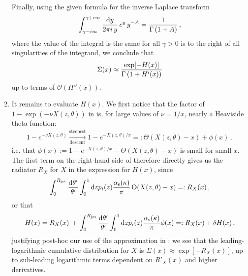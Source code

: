 \begin{enumerate}[label=\alph*)]
    Finally, using the given formula for the inverse Laplace transform
    \begin{align}
        \label{eq:inverse-laplace-example}
        \int_{\gamma - i \infty}^{\gamma + i\infty}
        \frac{\dd y}{2\pi i\, y}
        \,
        e^{y} \,y^{-A}
        =
        \frac{1}{\Gamma\le(1 + A\ri)}
        \,,
    \end{align}
    where the value of the integral is the same for all \(\gamma > 0\) is to the right of all singularities of the integrand, we conclude that
    \begin{align}
        \Sigma(x)
        \approx
        \frac{\exp[-H(x)]}{\Gamma\left(1 + H'(x)\right)}
    \end{align}
    up to terms of \(\mathcal{O}(H''(x))\).


    \item
    It remains to evaluate \(H(x)\).
    We first notice that the factor of \(1 - \exp(-\nu X(z,\theta))\) in  is, for large values of \(\nu = 1/x\), nearly a Heaviside theta function:
    \begin{align}
        \label{eq:exponential-approx-heaviside}
        1 - e^{-\nu X(z,\theta)}
        \xrightarrow[\text{descent}]{\text{steepest}}
        1 - e^{-X(z,\theta)/x}
        =:
        \Theta(X(z,\theta) - x) + \phi(x)
        \,,
    \end{align}
    i.e. that \(\phi(x) := 1 - e^{-X(z,\theta)/x} - \Theta(X(z,\theta) - x)\) is small for small \(x\).
    The first term on the right-hand side of  therefore directly gives us the radiator \(R_X\) for \(X\) in the expression for \(H(x)\), since
    \begin{align}
        \int_0^{R_\text{jet}} \frac{\dd \theta'}{\theta'}
        \int_0^1 \dd z p_i(z)
        \frac{\alpha_{\mathrm{s}}(\kappa)}{\pi}
        \,
        \Theta(X(z,\theta) - x)
        =:
        R_X(x)
        \,,
    \end{align}
    or that
    \begin{align}
        H(x)
        =
        R_X(x)
        \, + \,
        \int_0^{R_\text{jet}} \frac{\dd \theta'}{\theta'}
        \int_0^1 \dd z p_i(z)
        \frac{\alpha_{\mathrm{s}}(\kappa)}{\pi}
        \phi(x)
        =:
        R_X(x) + \delta H(x)
        \,,
    \end{align}
    justifying post-hoc our use of the approximation in :
    we see that the leading-logarithmic cumulative distribution for \(X\) is \(\Sigma(x) \approx \exp[-R_X(x)]\), up to sub-leading logarithmic terms dependent on \(R'_X(x)\) and higher derivatives.


\end{enumerate}
